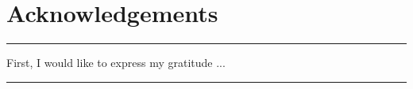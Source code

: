 

\chapter*{Acknowledgements}
\minitoc

\noindent\rule[2pt]{\textwidth}{0.5pt}
\vspace{5mm}

First, I would like to express my gratitude ...

\vspace{5mm}
\noindent\rule[2pt]{\textwidth}{0.5pt}


